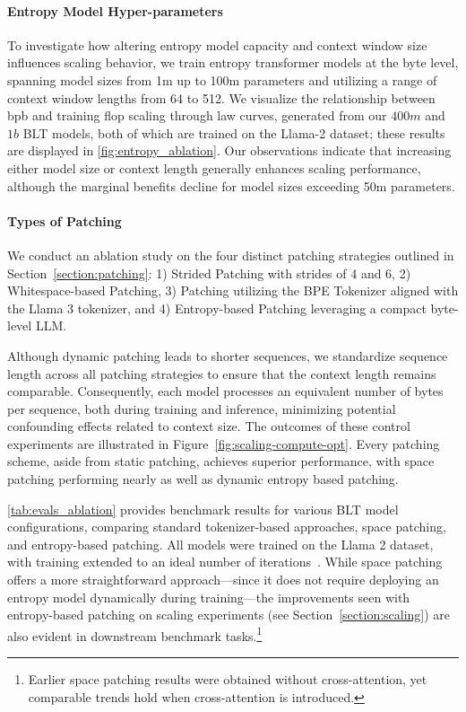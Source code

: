 \paragraph{Entropy Model Hyper-parameters} To investigate how altering entropy model capacity and context window size influences scaling behavior, we train entropy transformer models at the byte level, spanning model sizes from 1m up to 100m parameters and utilizing a range of context window lengths from 64 to 512. We visualize the relationship between bpb and training flop scaling through law curves, generated from our $400m$ and $1b$ {\textsc BLT} models, both of which are trained on the Llama-2 dataset; these results are displayed in \autoref{fig:entropy_ablation}. Our observations indicate that increasing either model size or context length generally enhances scaling performance, although the marginal benefits decline for model sizes exceeding 50m parameters.

\paragraph{Types of Patching}

We conduct an ablation study on the four distinct patching strategies outlined in Section~\ref{section:patching}: 1) Strided Patching with strides of 4 and 6, 2) Whitespace-based Patching, 3) Patching utilizing the BPE Tokenizer aligned with the Llama 3 tokenizer, and 4) Entropy-based Patching leveraging a compact byte-level LLM.

Although dynamic patching leads to shorter sequences, we standardize sequence length across all patching strategies to ensure that the context length remains comparable. Consequently, each model processes an equivalent number of bytes per sequence, both during training and inference, minimizing potential confounding effects related to context size. The outcomes of these control experiments are illustrated in Figure~\ref{fig:scaling-compute-opt}. Every patching scheme, aside from static patching, achieves superior performance, with space patching performing nearly as well as dynamic entropy based patching.

\autoref{tab:evals_ablation} provides benchmark results for various {\textsc BLT} model configurations, comparing standard tokenizer-based approaches, space patching, and entropy-based patching. All models were trained on the Llama 2 dataset, with training extended to an ideal number of iterations~\citep{dubey2024llama}. While space patching offers a more straightforward approach—since it does not require deploying an entropy model dynamically during training—the improvements seen with entropy-based patching on scaling experiments (see Section~\ref{section:scaling}) are also evident in downstream benchmark tasks.\footnote{Earlier space patching results were obtained without cross-attention, yet comparable trends hold when cross-attention is introduced.}

